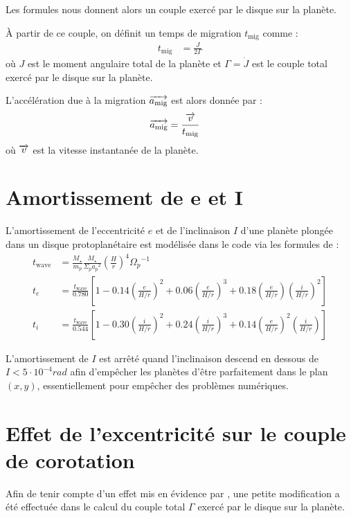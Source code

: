 Les formules nous donnent alors un couple exercé par le disque sur la planète. 

À partir de ce couple, on définit un temps de migration $t_\text{mig}$ comme : 
\begin{align}
t_\text{mig} &= \frac{J}{2\Gamma}
\end{align}
où $J$ est le moment angulaire total de la planète et $\Gamma=\dot{J}$ est le couple total exercé par le disque sur la planète.

L'accélération due à la migration ${\overrightarrow{a_\text{mig}}}$ est alors donnée par :
\begin{align}
{\overrightarrow{a_\text{mig}}} &= \frac{{\overrightarrow{v}}}{t_\text{mig}}
\end{align}
où ${\overrightarrow{v}}$ est la vitesse instantanée de la planète.

\section{Amortissement de e et I}
L'amortissement de l'eccentricité $e$ et de l'inclinaison $I$ d'une planète plongée dans un disque protoplanétaire est modélisée dans le code via les formules de \cite[eq. (9), (11) et (12)]{cresswell2008three} : 
\begin{subequations}
\begin{align}
t_\text{wave} &= \frac{M_\star}{m_p}\frac{M_\star}{\Sigma_p {a_p}^2}\left(\frac{H}{r}\right)^4{\Omega_p}^{-1}\\
t_e &= \frac{t_\text{wave}}{0.780}\left[1-0.14\left(\frac{e}{H/r}\right)^2 + 0.06 \left(\frac{e}{H/r}\right)^3 + 0.18\left(\frac{e}{H/r}\right)\left(\frac{i}{H/r}\right)^2\right]\\
t_i &= \frac{t_\text{wave}}{0.544}\left[1-0.30\left(\frac{i}{H/r}\right)^2 + 0.24 \left(\frac{i}{H/r}\right)^3 + 0.14\left(\frac{e}{H/r}\right)^2\left(\frac{i}{H/r}\right)\right]
\end{align}
\end{subequations}

L'amortissement de $I$ est arrêté quand l'inclinaison descend en dessous de $I<5\cdot 10^{-4}\unit{rad}$ afin d'empêcher les planètes d'être parfaitement dans le plan $(x,y)$, essentiellement pour empêcher des problèmes numériques.

\section{Effet de l'excentricité sur le couple de corotation}
Afin de tenir compte d'un effet mis en évidence par \cite{bitsch2010orbital}, une petite modification a été effectuée dans le calcul du couple total $\Gamma$ exercé par le disque sur la planète. 

